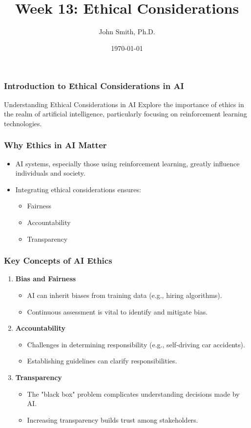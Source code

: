 \documentclass[aspectratio=169]{beamer}
\title[Ethical Considerations in AI]{Week 13: Ethical Considerations}
\author[J. Smith]{John Smith, Ph.D.}
\institute[University Name]{
  Department of Computer Science\\
  University Name\\
  \vspace{0.3cm}
  Email: email@university.edu
}
\date{\today}
\begin{document}
\frame{\titlepage}

\begin{frame}[fragile]
    \frametitle{Introduction to Ethical Considerations in AI}
    \begin{block}{Understanding Ethical Considerations in AI}
        Explore the importance of ethics in the realm of artificial intelligence, particularly focusing on reinforcement learning technologies.
    \end{block}
\end{frame}

\begin{frame}[fragile]
    \frametitle{Why Ethics in AI Matter}
    \begin{itemize}
        \item AI systems, especially those using reinforcement learning, greatly influence individuals and society.
        \item Integrating ethical considerations ensures:
            \begin{itemize}
                \item Fairness
                \item Accountability
                \item Transparency
            \end{itemize}
    \end{itemize}
\end{frame}

\begin{frame}[fragile]
    \frametitle{Key Concepts of AI Ethics}
    
    \begin{enumerate}
        \item \textbf{Bias and Fairness}
            \begin{itemize}
                \item AI can inherit biases from training data (e.g., hiring algorithms).
                \item Continuous assessment is vital to identify and mitigate bias.
            \end{itemize}
        
        \item \textbf{Accountability}
            \begin{itemize}
                \item Challenges in determining responsibility (e.g., self-driving car accidents).
                \item Establishing guidelines can clarify responsibilities.
            \end{itemize}
        
        \item \textbf{Transparency}
            \begin{itemize}
                \item The "black box" problem complicates understanding decisions made by AI.
                \item Increasing transparency builds trust among stakeholders.
            \end{itemize}
    \end{enumerate}
\end{frame}
\end{document}
